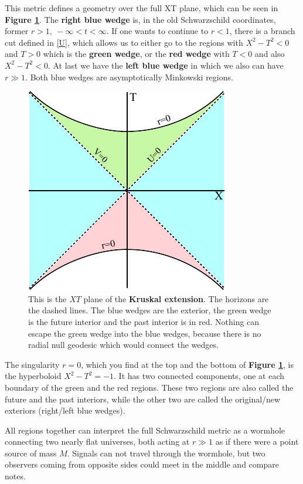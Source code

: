 	This metric defines a geometry over the full XT plane, which can be seen in \textbf{Figure \ref{kruskal}}. The \textbf{right {\color{blue} blue} wedge} is, in the old Schwarzschild coordinates, former $r>1,~-\infty<t<\infty$. If one wants to continue to $r<1$, there is a branch cut defined in \eqref{U}, which allows us to either go to the regions with $X^2-T^2<0$ and $T>0$ which is the \textbf{{\color{forestgreen} green} wedge}, or the \textbf{{\color{red} red} wedge} with $T<0$ and also $X^2-T^2<0$. At last we have the \textbf{left {\color{blue} blue} wedge} in which we also can have $r\gg1$. Both blue wedges are asymptotically Minkowski regions. 
	\begin{figure}[tbp]
			\begin{center}
				\includegraphics[scale=1]{kruskal}
			\end{center}
			\caption{This is the $XT$ plane of the \textbf{Kruskal extension}. The horizons are the dashed lines. The {\color{blue} blue} wedges are the exterior, the {\color{forestgreen} green} wedge is the future interior and the past interior is in {\color{red} red}. Nothing can escape the {\color{forestgreen} green} wedge into the {\color{blue} blue} wedges, because there is no radial null geodesic which would connect the wedges.}\label{kruskal}	
	\end{figure}
	The singularity $r=0$, which you find at the top and the bottom of \textbf{Figure \ref{kruskal}}, is the hyperboloid $X^2-T^2=-1$. It has two connected components, one at each boundary of the {\color{forestgreen} green} and the {\color{red} red} regions. These two regions are also called the {\color{forestgreen} future} and the {\color{red} past} interiors, while the other two are called the original/new exteriors (right/left {\color{blue} blue} wedges).
	
	All regions together can interpret the full Schwarzschild metric as a wormhole connecting two nearly flat universes, both acting at $r\gg1$ as if there were a point source of mass $M$. Signals can not travel through the wormhole, but two observers coming from opposite sides could meet in the middle and compare notes.